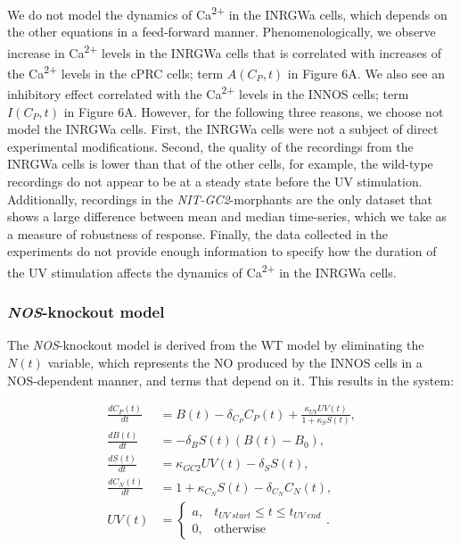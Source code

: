 \documentclass[
  11pt,
  letterpaper,
  DIV=11,
  numbers=noendperiod]{scrartcl}
\begin{document}
We do not model the dynamics of Ca\textsuperscript{2+} in the INRGWa
cells, which depends on the other equations in a feed-forward manner.
Phenomenologically, we observe increase in Ca\textsuperscript{2+} levels
in the INRGWa cells that is correlated with increases of the
Ca\textsuperscript{2+} levels in the cPRC cells; term \(A(C_P,t)\) in
Figure 6A. We also see an inhibitory effect correlated with the
Ca\textsuperscript{2+} levels in the INNOS cells; term \(I(C_P,t)\) in
Figure 6A. However, for the following three reasons, we choose not model
the INRGWa cells. First, the INRGWa cells were not a subject of direct
experimental modifications. Second, the quality of the recordings from
the INRGWa cells is lower than that of the other cells, for example, the
wild-type recordings do not appear to be at a steady state before the UV
stimulation. Additionally, recordings in the \emph{NIT-GC2}-morphants
are the only dataset that shows a large difference between mean and
median time-series, which we take as a measure of robustness of
response. Finally, the data collected in the experiments do not provide
enough information to specify how the duration of the UV stimulation
affects the dynamics of Ca\textsuperscript{2+} in the INRGWa cells.

\subsubsection{\texorpdfstring{\emph{NOS}-knockout
model}{NOS-knockout model}}\label{nos-knockout-model}

The \emph{NOS}-knockout model is derived from the WT model by
eliminating the \(N(t)\) variable, which represents the NO produced by
the INNOS cells in a NOS-dependent manner, and terms that depend on it.
This results in the system:

\begin{equation}\label{eq:*NOS*-knockout-model}
\begin{aligned}
\frac{dC_P(t)}{dt} &= B(t) - \delta_{C_P} C_P(t) + \frac{\kappa_{UV}UV(t)}{1+\kappa_S S(t)}, \\
\frac{dB(t)}{dt} &=  -  \delta_{B} S(t) (B(t)-B_0),\\
\frac{dS(t)}{dt} &=  \kappa_{GC2} UV(t) - \delta_S S(t),\\
\frac{dC_N(t)}{dt} &=  1 + \kappa_{C_N} S(t) - \delta_{C_N} C_N(t),\\
UV(t) &=
    \begin{cases}
        a, & t_{UV\: start} \leq t \leq t_{UV\: end}\\
        0, & \text{otherwise}
    \end{cases}   .
\end{aligned}
\end{equation}
\end{document}
